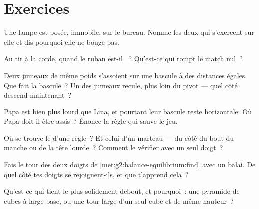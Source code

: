 \section{Exercices}

\begin{exercise}[$\star$]\label{exo:g2:balance-equilibrium:1}
Une lampe est posée, immobile, sur le bureau. Nomme les deux 
qui s'exercent sur elle et dis pourquoi elle ne bouge pas.
\end{exercise}

\begin{exercise}[$\star$]\label{exo:g2:balance-equilibrium:2}
Au tir à la corde, quand le ruban est-il ~? Qu'est-ce qui
rompt le match nul~?
\end{exercise}

\begin{exercise}[$\star$]\label{exo:g2:balance-equilibrium:3}
Deux jumeaux de même poids s'assoient sur une bascule à des distances
égales. Que fait la bascule~? Un des jumeaux recule, plus loin du
pivot --- quel côté descend maintenant~?
\end{exercise}

\begin{exercise}[$\star$]\label{exo:g2:balance-equilibrium:4}
Papa est bien plus lourd que Lina, et pourtant leur bascule reste
horizontale. Où Papa doit-il être assis~? Énonce la règle qui sauve
le jeu.
\end{exercise}

\begin{exercise}[$\star$]\label{exo:g2:balance-equilibrium:5}
Où se trouve le  d'une règle~? Et celui d'un marteau
--- du côté du bout du manche ou de la tête lourde~? Comment le
vérifier avec un seul doigt~?
\end{exercise}

\begin{exercise}[$\star$]\label{exo:g2:balance-equilibrium:6}
Fais le tour des deux doigts de
\cref{met:g2:balance-equilibrium:find} avec un balai. De quel côté
tes doigts se rejoignent-ils, et que t'apprend cela~?
\end{exercise}

\begin{exercise}[$\star$]\label{exo:g2:balance-equilibrium:7}
Qu'est-ce qui tient le plus solidement debout, et pourquoi~: une
pyramide de cubes à large base, ou une tour large d'un seul cube et
de même hauteur~?
\end{exercise}

